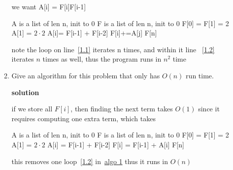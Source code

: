 \documentclass[letterpaper,12pt]{article}
\begin{document}
\begin{enumerate}
\begin{enumerate}
we want A[i] = F[i]F[i-1]

\begin{algorithmic}[1]\label{algo1.1}
    \State A is a list of len n, init to 0
    \State F is a list of len n, init to 0
    \State F[0] = F[1] = 2 
    \State A[1] = \(2\cdot 2\)
    \label{1.1}
        \State A[i]= F[i-1] + F[i-2]
        \label{1.2}
            \State F[i]+=A[j]
        \EndFor
    \EndFor
    \State \Return F[n]
\end{algorithmic}

note the loop on line~\ref{1.1} iterates n times, and within it line ~\ref{1.2} iterates \(n\) times as well, thus the program runs in \(n^2\) time


\item
Give an algorithm for this problem that only has $O(n)$ 
run time. 

\textbf{solution}






if we store all \(F[i]\), then finding the next term takes \(O(1)\) since it requires computing one extra term, which takes 

\begin{algorithmic}[1]
    \State A is a list of len n, init to 0
    \State F is a list of len n, init to 0
    \State F[0] = F[1] = 2 
    \State A[1] = \(2\cdot 2\)
    \label{1.2.1}
        \State A[i] = F[i-1] + F[i-2]
        \State F[i] = F[i-1] + A[i]
    \EndFor
    \State \Return F[n]
\end{algorithmic}

this removes one loop~\ref{1.2} in~\hyperref[algo1.1]{algo 1} thus it runs in \(O(n)\)


\end{enumerate}




\end{enumerate}
\end{document}
